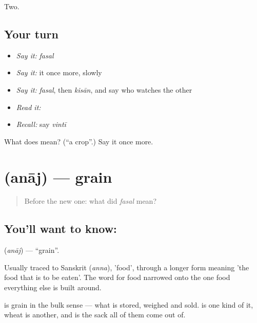 \begin{grammarlens}[title={What you've built}]
Two.
\end{grammarlens}

\subsection*{Your turn}
\begin{itemize}
\raggedright
  \item \emph{Say it:} \emph{fasal}
  \item \emph{Say it:} it once more, slowly
  \item \emph{Say it:} \emph{fasal}, then \emph{kisān}, and say who watches the other
  \item \emph{Read it:} \textbf{}
  \item \emph{Recall:} say \emph{vintī}
\end{itemize}

\begin{tcolorbox}[breakable,colback=teal!4,colframe=teal!35!black,title={Before you move on}]
What does  mean? (\textquotedblleft{}a crop\textquotedblright{}.) Say it once more.
\end{tcolorbox}
\section[\texorpdfstring{\hi{अनाज} (anāj)}{अनाज (anāj)}]{ (anāj) — grain}

\label{lesson:HI-C66-grain}



\begin{quote}
Before the new one: what did \emph{fasal} mean?
\end{quote}

\subsection*{You'll want to know: }
\textbf{} (\emph{anāj}) — \textquotedblleft{}grain\textquotedblright{}.

Usually traced to Sanskrit  (\emph{anna}), 'food', through a longer form meaning 'the food that is to be eaten'. The word for food narrowed onto the one food everything else is built around.

 is grain in the bulk sense — what is stored, weighed and sold.  is one kind of it, wheat is another, and  is the sack all of them come out of.

